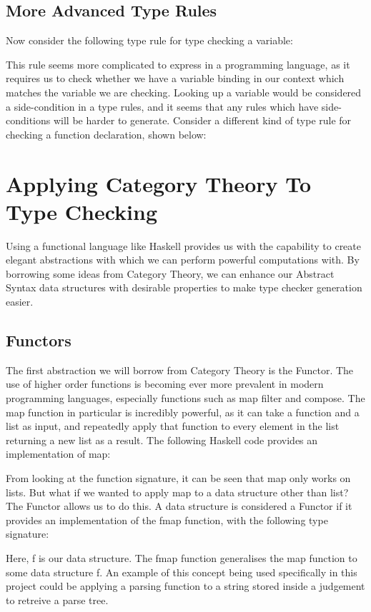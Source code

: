 \documentclass{UoYCSproject}
\begin{document}
\subsection{More Advanced Type Rules}
Now consider the following type rule for type checking a variable:

This rule seems more complicated to express in a programming language, as it
requires us to check whether we have a variable binding in our context which
matches the variable we are checking. Looking up a variable would be considered
a side-condition in a type rules, and it seems that any rules which have
side-conditions will be harder to generate. Consider a different kind of type
rule for checking a function declaration, shown below:





\cite{PierceTAPL}

\section{Applying Category Theory To Type Checking}
\label{sec:CategoryTheory}

Using a functional language like Haskell provides us with the capability to
create elegant abstractions with which we can perform powerful computations
with. By borrowing some ideas from Category Theory, we can enhance our Abstract
Syntax data structures with desirable properties to make type checker generation
easier.

\subsection{Functors}
The first abstraction we will borrow from Category Theory is the Functor. The
use of higher order functions is becoming ever more prevalent in modern
programming languages, especially functions such as {\ttfamily map} 
{\ttfamily filter} and {\ttfamily compose}. The {\ttfamily map} function in 
particular is incredibly powerful, as it can take a function and a list as
input, and repeatedly apply that function to every element in the list returning
a new list as a result. The following Haskell code provides an implementation
of {\ttfamily map}:

From looking at the function signature, it can be seen that map only works on
lists. But what if we wanted to apply map to a data structure other than list?
The Functor allows us to do this. A data structure is considered a Functor if
it provides an implementation of the {\ttfamily fmap} function, with the 
following type signature:

Here, {\ttfamily f} is our data structure. The {\ttfamily fmap} function
generalises the map function to some data structure {\ttfamily f}. An example
of this concept being used specifically in this project could be applying a
parsing function to a string stored inside a judgement to retreive a parse tree.
\end{document}
